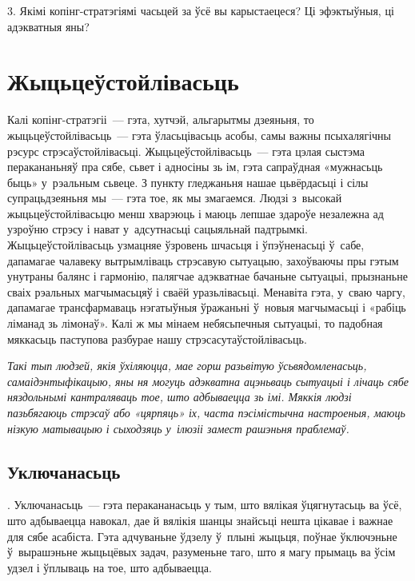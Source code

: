 3. Якімі копінг-стратэгіямі часьцей за ўсё вы карыстаецеся? Ці эфэктыўныя, ці адэкватныя яны?


\section{Жыцьцеўстойлівасьць}

Калі копінг-стратэгіі~--- гэта, хутчэй, альгарытмы дзеяньня, то жыцьцеўстойлівасьць~--- гэта ўласьцівасьць асобы, самы важны псыхалягічны рэсурс стрэсаўстойлівасьці. Жыцьцеўстойлівасьць~--- гэта цэлая сыстэма перакананьняў пра сябе, сьвет і адносіны зь ім, гэта сапраўдная «мужнасьць быць» у~рэальным сьвеце. З пункту гледжаньня нашае цьвёрдасьці і сілы супрацьдзеяньня мы~--- гэта тое, як мы змагаемся. Людзі з~высокай жыцьцеўстойлівасьцю менш хварэюць і маюць лепшае здароўе незалежна ад узроўню стрэсу і нават у~адсутнасьці сацыяльнай падтрымкі. Жыцьцеўстойлівасьць узмацняе ўзровень шчасьця і ўпэўненасьці ў~сабе, дапамагае чалавеку вытрымліваць стрэсавую сытуацыю, захоўваючы пры гэтым унутраны балянс і гармонію, палягчае адэкватнае бачаньне сытуацыі, прызнаньне сваіх рэальных магчымасьцяў і сваёй уразьлівасьці. Менавіта гэта, у~сваю чаргу, дапамагае трансфармаваць нэгатыўныя ўражаньні ў~новыя магчымасьці і «рабіць ліманад зь лімонаў». Калі ж мы мінаем небясьпечныя сытуацыі, то падобная мяккасьць паступова разбурае нашу стрэсасутаўстойлівасьць.

\emph{Такі тып людзей, якія ўхіляюцца, мае горш разьвітую ўсьвядомленасьць, самаідэнтыфікацыю, яны ня могуць адэкватна ацэньваць сытуацыі і лічаць сябе няздольнымі кантраляваць тое, што адбываецца зь імі. Мяккія людзі пазьбягаюць стрэсаў або «цярпяць» іх, часта пэсімістычна настроеныя, маюць нізкую матывацыю і сыходзяць у~ілюзіі замест рашэньня праблемаў.}


\subsection*{Уключанасьць}. Уключанасьць~--- гэта перакананасьць у тым, што вялікая ўцягнутасьць ва ўсё, што адбываецца навокал, дае й вялікія шанцы знайсьці нешта цікавае і важнае для сябе асабіста. Гэта адчуваньне ўдзелу ў~плыні жыцьця, поўнае ўключэньне ў~вырашэньне жыцьцёвых задач, разуменьне таго, што я магу прымаць ва ўсім удзел і ўплываць на тое, што адбываецца. 


